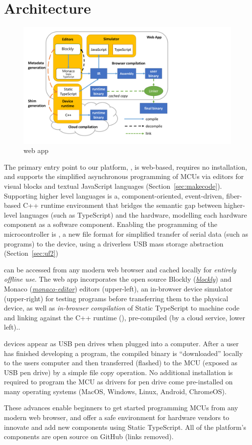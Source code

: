 \section{Architecture}

\begin{figure}[t]
    \includegraphics[width=4.8in]{makecodeFig.pdf}
\caption{\label{fig:makecode}\MC web app}
\end{figure}

The primary entry point to our platform, \MCN, is web-based, requires no installation, and supports the simplified asynchronous programming of MCUs via editors for visual blocks and textual JavaScript languages (Section~\ref{sec:makecode}). Supporting higher level languages is \CON a, component-oriented, event-driven, fiber-based C++ runtime environment that bridges the semantic gap between higher-level languages (such as TypeScript) and the hardware, modelling each hardware component as a software component. Enabling the programming of the microcontroller is \UFN, a new file format for simplified transfer of serial data (such as programs) to the device, using a driverless USB mass storage abstraction (Section~\ref{sec:uf2})

\MC can be accessed from any modern web browser and cached locally for \emph{entirely offline use}. The \MC web app incorporates the open source Blockly (\emph{\href{https://github.com/google/blockly}{blockly}}) and Monaco (\emph{\href{https://github.com/Microsoft/monaco-editor}{monaco-editor}}) editors (upper-left), an in-browser device simulator (upper-right) for testing programs before transferring them to the physical device, as well as \emph{in-browser compilation} of Static TypeScript to machine code and linking against the C++ runtime (\emph{\CON}), pre-compiled (by a cloud service, lower left)..

\MC devices appear as USB pen drives when plugged into a computer. After a user has finished developing a program, the compiled binary is ``downloaded'' locally to the users computer and then transferred (flashed) to the MCU (exposed as USB pen drive) by a simple file copy operation. No additional installation is required to program the MCU as drivers for pen drive come pre-installed on many operating systems (MacOS, Windows, Linux, Android, ChromeOS).

These advances enable beginners to get started programming MCUs from any modern web browser, and offer a safe environment for hardware vendors to innovate and add new components using Static TypeScript. All of the platform's components are open source on GitHub (links removed).